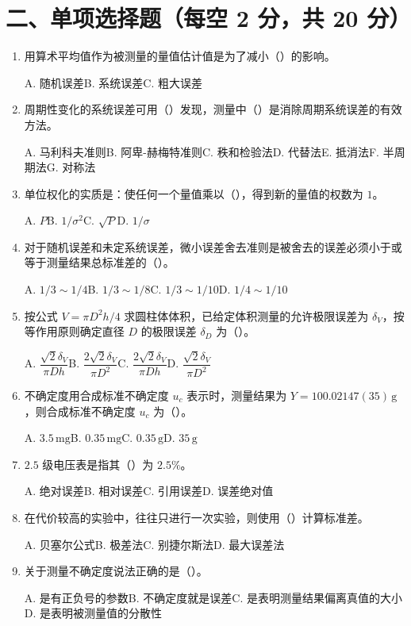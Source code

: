 \documentclass[UTF8,12pt,a4paper]{ctexart}
\begin{document}
\newpage

\section*{二、单项选择题（每空 2 分，共 20 分）}
\begin{enumerate}[label=\arabic*、]
\item 用算术平均值作为被测量的量值估计值是为了减小（\quad）的影响。
\par\noindent A. 随机误差\quad B. 系统误差\quad C. 粗大误差
\item 周期性变化的系统误差可用（\quad）发现，测量中（\quad）是消除周期系统误差的有效方法。
\par\noindent A. 马利科夫准则\quad B. 阿卑-赫梅特准则\quad C. 秩和检验法\quad D. 代替法\quad E. 抵消法\quad F. 半周期法\quad G. 对称法
\item 单位权化的实质是：使任何一个量值乘以（\quad），得到新的量值的权数为 $1$。
\par\noindent A. $P$\quad B. $1/\sigma^2$\quad C. $\sqrt{P}$\quad D. $1/\sigma$
\item 对于随机误差和未定系统误差，微小误差舍去准则是被舍去的误差必须小于或等于测量结果总标准差的（\quad）。
\par\noindent A. $1/3\sim1/4$\quad B. $1/3\sim1/8$\quad C. $1/3\sim1/10$\quad D. $1/4\sim1/10$
\item 按公式 $V=\pi D^2h/4$ 求圆柱体体积，已给定体积测量的允许极限误差为 $\delta_V$，按等作用原则确定直径 $D$ 的极限误差 $\delta_D$ 为（\quad）。
\par\noindent A. $\dfrac{\sqrt2\delta_V}{\pi Dh}$\quad B. $\dfrac{2\sqrt2\delta_V}{\pi D^2}$\quad C. $\dfrac{2\sqrt2\delta_V}{\pi Dh}$\quad D. $\dfrac{\sqrt2\delta_V}{\pi D^2}$
\item 不确定度用合成标准不确定度 $u_c$ 表示时，测量结果为 $Y=100.02147(35)\,\mathrm{g}$，则合成标准不确定度 $u_c$ 为（\quad）。
\par\noindent A. $3.5\,\mathrm{mg}$\quad B. $0.35\,\mathrm{mg}$\quad C. $0.35\,\mathrm{g}$\quad D. $35\,\mathrm{g}$
\item $2.5$ 级电压表是指其（\quad）为 $2.5\%$。
\par\noindent A. 绝对误差\quad B. 相对误差\quad C. 引用误差\quad D. 误差绝对值
\item 在代价较高的实验中，往往只进行一次实验，则使用（\quad）计算标准差。
\par\noindent A. 贝塞尔公式\quad B. 极差法\quad C. 别捷尔斯法\quad D. 最大误差法
\item 关于测量不确定度说法正确的是（\quad）。
\par\noindent A. 是有正负号的参数\quad B. 不确定度就是误差\quad C. 是表明测量结果偏离真值的大小\quad D. 是表明被测量值的分散性
\end{enumerate}
\end{document}
